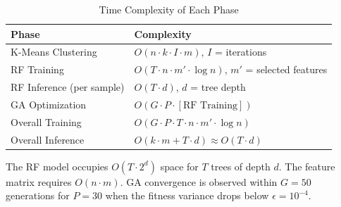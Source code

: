 \documentclass[conference]{IEEEtran}
\begin{document}
\begin{table}[htbp]
\caption{Time Complexity of Each Phase}
\begin{center}
\begin{tabular}{|p{3.2cm}|p{4.2cm}|}
\hline
\textbf{Phase} & \textbf{Complexity} \\
\hline
K-Means Clustering & $O(n \cdot k \cdot I \cdot m)$, $I$ = iterations \\
\hline
RF Training & $O(T \cdot n \cdot m' \cdot \log n)$, $m'$ = selected features \\
\hline
RF Inference (per sample) & $O(T \cdot d)$, $d$ = tree depth \\
\hline
GA Optimization & $O(G \cdot P \cdot [\text{RF Training}])$ \\
\hline
Overall Training & $O(G \cdot P \cdot T \cdot n \cdot m' \cdot \log n)$ \\
\hline
Overall Inference & $O(k \cdot m + T \cdot d) \approx O(T \cdot d)$ \\
\hline
\end{tabular}
\label{tab:complexity}
\end{center}
\end{table}

The RF model occupies $O(T \cdot 2^d)$ space for $T$ trees of depth $d$. The feature matrix requires $O(n \cdot m)$. GA convergence is observed within $G = 50$ generations for $P = 30$ when the fitness variance drops below $\epsilon = 10^{-4}$.

\begin{table}[htbp]
\caption{Implemented AIRDA Framework vs.\ Existing RF Methods}
\begin{center}
\label{tab:feature_comparison}
\end{center}
\end{table}
\end{document}
